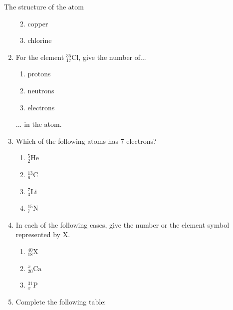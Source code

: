 \begin{exercises}{The structure of the atom}
\begin{enumerate}[noitemsep, label=\textbf{\arabic*}. ]
\begin{enumerate}[noitemsep, label=\textbf{\alph*}. ]
\label{m38745*uid22}\item copper
\label{m38745*uid23}\item chlorine
\end{enumerate}
                \label{m38745*uid24}\item 
For the element $_{17}^{35}\text{Cl}$, give the number of...
\label{m38745*id256843}\begin{enumerate}[noitemsep, label=\textbf{\alph*}. ] 
            \label{m38745*uid25}\item protons
\label{m38745*uid26}\item neutrons
\label{m38745*uid27}\item electrons
\end{enumerate}
... in the atom.\newline
\label{m38745*uid28}\item Which of the following atoms has 7 electrons?
\label{m38745*id256898}\begin{enumerate}[noitemsep, label=\textbf{\alph*}. ] 
            \label{m38745*uid29}\item $_{2}^{5}\text{He}$
\label{m38745*uid30}\item $_{6}^{13}\text{C}$
\label{m38745*uid31}\item $_{3}^{7}\text{Li}$
\label{m38745*uid32}\item $_{7}^{15}\text{N}$
\end{enumerate}
                \label{m38745*uid33}\item 
In each of the following cases, give the number or the element symbol represented by X.
\label{m38745*id257023}\begin{enumerate}[noitemsep, label=\textbf{\alph*}. ] 
            \label{m38745*uid34}\item $_{18}^{40}\text{X}$
\label{m38745*uid35}\item $_{20}^{x}\text{Ca}$
\label{m38745*uid36}\item $_{x}^{31}\text{P}$
\end{enumerate}
                \label{m38745*uid37}\item 
Complete the following table:
          \begin{table}[H]
        \begin{center}
      \label{m38745*id257121}

\end{center}
\end{table}
\end{enumerate}
\end{exercises}
